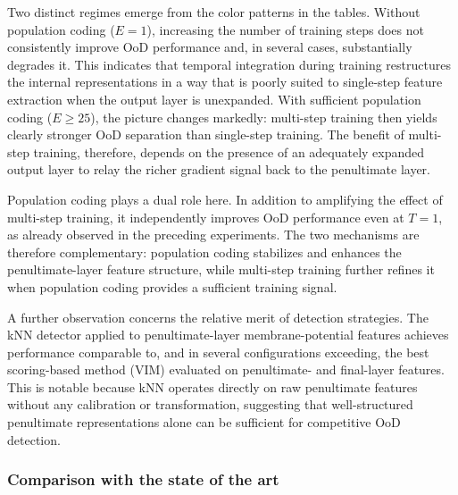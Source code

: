 \documentclass{ieeeaccess}
\begin{document}
Two distinct regimes emerge from the color patterns in the tables. Without population coding ($E=1$), increasing the number of training steps does not consistently improve OoD performance and, in several cases, substantially degrades it. This indicates that temporal integration during training restructures the internal representations in a way that is poorly suited to single-step feature extraction when the output layer is unexpanded. With sufficient population coding ($E \geq 25$), the picture changes markedly: multi-step training then yields clearly stronger OoD separation than single-step training. The benefit of multi-step training, therefore, depends on the presence of an adequately expanded output layer to relay the richer gradient signal back to the penultimate layer.

Population coding plays a dual role here. In addition to amplifying the effect of multi-step training, it independently improves OoD performance even at $T=1$, as already observed in the preceding experiments. The two mechanisms are therefore complementary: population coding stabilizes and enhances the penultimate-layer feature structure, while multi-step training further refines it when population coding provides a sufficient training signal.

A further observation concerns the relative merit of detection strategies. The kNN detector applied to penultimate-layer membrane-potential features achieves performance comparable to, and in several configurations exceeding, the best scoring-based method (VIM) evaluated on penultimate- and final-layer features. This is notable because kNN operates directly on raw penultimate features without any calibration or transformation, suggesting that well-structured penultimate representations alone can be sufficient for competitive OoD detection.
    
\subsubsection*{Comparison with the state of the art}
\end{document}

